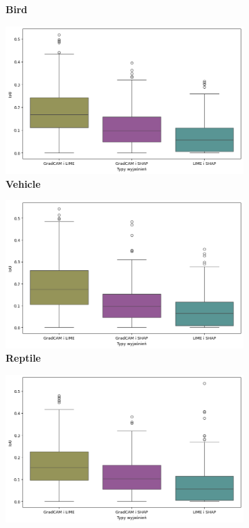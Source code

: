 \begin{figure}[h]
\begin{subfigure}[b]{0.3\textwidth}
		\caption{\textbf{Bird}}  \label{}
	\end{subfigure}
	\begin{subfigure}[b]{0.3\textwidth}
		\centering\includegraphics[width=.9\textwidth]{img/base_coherence_vehicle}
		\caption{\textbf{Vehicle}}  \label{}
	\end{subfigure}
	\begin{subfigure}[b]{0.3\textwidth}
		\centering\includegraphics[width=.9\textwidth]{img/base_coherence_reptile}
		\caption{\textbf{Reptile}}  \label{}
	\end{subfigure}
	\begin{subfigure}[b]{0.3\textwidth}
		\centering\includegraphics[width=.9\textwidth]{img/base_coherence_carnivore}

\end{subfigure}
\end{figure}

